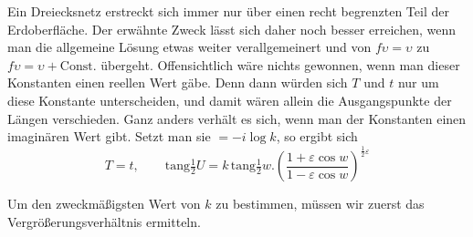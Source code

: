\par\indent{}%
Ein Dreiecksnetz erstreckt sich immer nur über einen recht begrenzten Teil der Erdoberfläche. Der erwähnte Zweck lässt sich daher noch besser erreichen, wenn man die allgemeine Lösung etwas weiter verallgemeinert und von \(f\upsilon=\upsilon\) zu \(f\upsilon=\upsilon+\text{Const.}\) übergeht. Offensichtlich wäre nichts gewonnen, wenn man dieser Konstanten einen reellen Wert gäbe. Denn dann würden sich \(T\) und \(t\) nur um diese Konstante unterscheiden, und damit wären allein die Ausgangspunkte der Längen verschieden. Ganz anders verhält es sich, wenn man der Konstanten einen imaginären Wert gibt. Setzt man sie \(=-i\log k\), so ergibt sich
\[
T=t,\qquad \mathrm{tang}\tfrac{1}{2}U=k\,\mathrm{tang}\tfrac{1}{2}w\mathord{.}(\frac{1+\varepsilon\cos w}{1-\varepsilon\cos w})^{\frac{1}{2}\varepsilon}
\]
\par\indent Um den zweckmäßigsten Wert von \(k\) zu bestimmen, müssen wir zuerst das Vergrößerungsverhältnis ermitteln.

